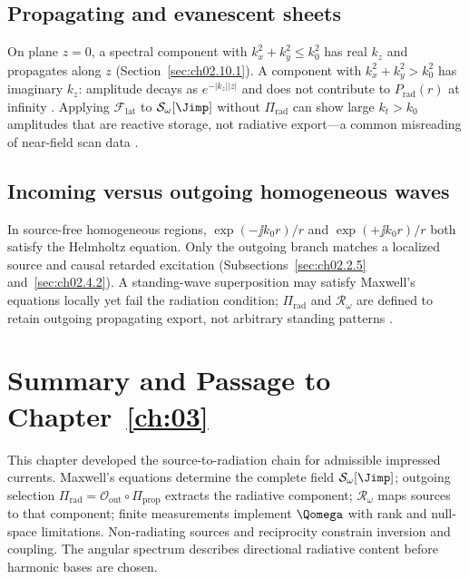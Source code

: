 \subsection{Propagating and evanescent sheets}
\label{sec:ch02.11.4}

On plane $z=0$, a spectral component with $k_x^2+k_y^2\le k_0^2$ has real $k_z$ and propagates along $z$ (Section~\ref{sec:ch02.10.1}). A component with $k_x^2+k_y^2>k_0^2$ has imaginary $k_z$: amplitude decays as $e^{-|k_z||z|}$ and does not contribute to $P_{\mathrm{rad}}(r)$ at infinity \cite{stratton1941,harrington2001}. Applying $\mathcal{F}_{\mathrm{lat}}$ to $\mathcal{S}_\omega[\Jimp]$ without $\Pi_{\mathrm{rad}}$ can show large $k_t>k_0$ amplitudes that are reactive storage, not radiative export---a common misreading of near-field scan data \cite{hansen1988,devaney2004}.

\subsection{Incoming versus outgoing homogeneous waves}
\label{sec:ch02.11.5}

In source-free homogeneous regions, $\exp(-\jj k_0 r)/r$ and $\exp(+\jj k_0 r)/r$ both satisfy the Helmholtz equation. Only the outgoing branch matches a localized source and causal retarded excitation (Subsections~\ref{sec:ch02.2.5} and~\ref{sec:ch02.4.2}). A standing-wave superposition may satisfy Maxwell's equations locally yet fail the radiation condition; $\Pi_{\mathrm{rad}}$ and $\mathcal{R}_\omega$ are defined to retain outgoing propagating export, not arbitrary standing patterns \cite{stratton1941,jackson1999}.

\section{Summary and Passage to Chapter~\ref{ch:03}}
\label{sec:ch02.12}

This chapter developed the source-to-radiation chain for admissible impressed currents. Maxwell's equations determine the complete field $\mathcal{S}_\omega[\Jimp]$; outgoing selection $\Pi_{\mathrm{rad}}=\mathcal{O}_{\mathrm{out}}\circ\Pi_{\mathrm{prop}}$ extracts the radiative component; $\mathcal{R}_\omega$ maps sources to that component; finite measurements implement $\Qomega$ with rank and null-space limitations. Non-radiating sources and reciprocity constrain inversion and coupling. The angular spectrum describes directional radiative content before harmonic bases are chosen.

